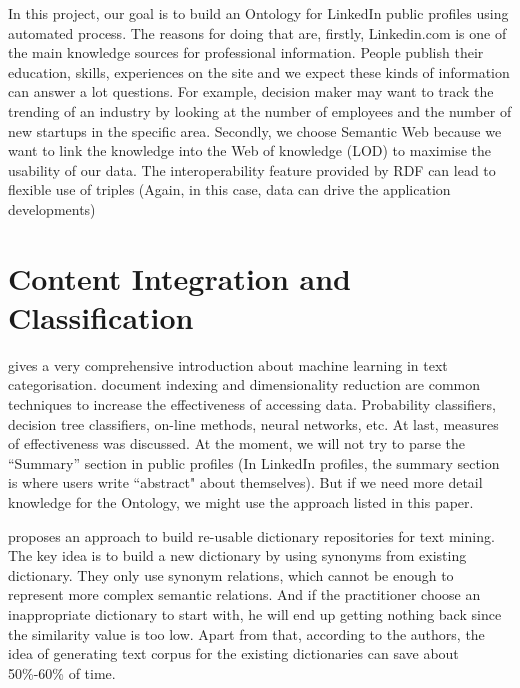 In this project, our goal is to build an Ontology for LinkedIn public profiles using automated process. The reasons for doing that are, firstly, Linkedin.com is one of the main knowledge sources for professional information. People publish their education, skills, experiences on the site and we expect these kinds of information can answer a lot questions. For example, decision maker may want to track the trending of an industry by looking at the number of employees and the number of new startups in the specific area. Secondly, we choose Semantic Web because we want to link the knowledge into the Web of knowledge (LOD) to maximise the usability of our data.  The interoperability feature provided by RDF can lead to flexible use of triples (Again, in this case, data can drive the application developments)


\section{Content Integration and Classification}

\cite{sebastiani2002} gives a very comprehensive introduction about machine learning in text categorisation. document indexing and dimensionality reduction are common techniques to increase the effectiveness of accessing data. Probability classifiers, decision tree classifiers, on-line methods, neural networks, etc. At last, measures of effectiveness was discussed. At the moment, we will not try to parse the ``Summary'' section in public profiles (In LinkedIn profiles, the summary section is where users write ``abstract" about themselves). But if we need more detail knowledge for the Ontology, we might use the approach listed in this paper.

\cite{godbole2010} proposes an approach to build re-usable dictionary repositories for text mining. The key idea is to build a new dictionary by using synonyms from existing dictionary. They only use synonym relations, which cannot be enough to represent more complex semantic relations. And if the practitioner choose an inappropriate dictionary to start with, he will end up getting nothing back since the similarity value is too low. Apart from that, according to the authors, the idea of generating text corpus for the existing dictionaries can save about 50\%-60\% of time.

